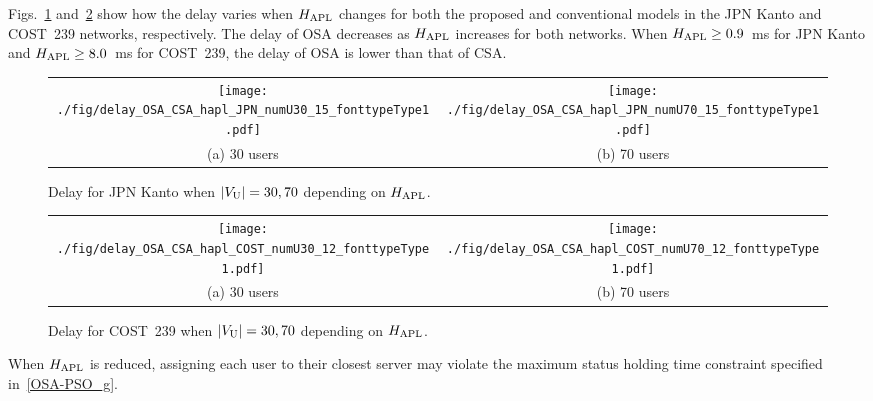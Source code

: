 \documentclass[conference]{IEEEtran}
\newcommand\blue[1]{\textcolor{blue}{#1}}
\begin{document}
\begin{CJK}{UTF8}{ipxm}
Figs.~\ref{fig:delay_OSA_CSA_hapl_JPN} and~\ref{fig:delay_OSA_CSA_hapl_COST} show how the delay varies when $H_{\rm APL}$ changes for both the proposed and conventional models in the JPN Kanto and COST~239 networks, respectively.
The delay of OSA decreases as $H_{\rm APL}$ increases for both networks.
When $H_{\rm APL} \geq 0.9$~ms for JPN Kanto and $H_{\rm APL} \geq 8.0$~ms for COST~239, the delay of OSA is lower than that of CSA.
\begin{figure}[t]
  \begin{center}
      \begin{tabular}{cc}
      \texttt{[image: ./fig/delay\_OSA\_CSA\_hapl\_JPN\_numU30\_15\_fonttypeType1.pdf]} &
      \texttt{[image: ./fig/delay\_OSA\_CSA\_hapl\_JPN\_numU70\_15\_fonttypeType1.pdf]} \\
      (a) 30 users & (b) 70 users
      \end{tabular}
  \end{center}
      \vspace{-0.3cm}
  \caption{Delay for JPN Kanto when $|V_{\rm U}| = 30, 70$ depending on $H_{\rm APL}$.}
  \label{fig:delay_OSA_CSA_hapl_JPN}
\end{figure}
\begin{figure}[t]
  \begin{center}
      \begin{tabular}{cc}
      \texttt{[image: ./fig/delay\_OSA\_CSA\_hapl\_COST\_numU30\_12\_fonttypeType1.pdf]} &
      \texttt{[image: ./fig/delay\_OSA\_CSA\_hapl\_COST\_numU70\_12\_fonttypeType1.pdf]} \\
      (a) 30 users & (b) 70 users
      \end{tabular}
  \end{center}
      \vspace{-0.3cm}
  \caption{Delay for COST~239 when $|V_{\rm U}| = 30, 70$ depending on $H_{\rm APL}$.}
  \label{fig:delay_OSA_CSA_hapl_COST}
\end{figure}
When $H_{\rm APL}$ is reduced, assigning each user to their closest server may violate the maximum status holding time constraint specified in~\eqref{OSA-PSO_g}.

\end{CJK}
\end{document}

